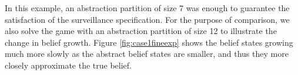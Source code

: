 In this example, an abstraction partition of size 7 was enough to guarantee the satisfaction of the surveillance specification.  For the purpose of comparison, we also solve the game with  an abstraction partition of size 12  to illustrate the change in belief growth. Figure \ref{fig:case1fineexp} shows the belief states growing much more slowly as the abstract belief states are smaller, and thus they more closely  approximate the true belief.
\begin{figure}

	\begin{minipage}{5.0cm}
		\centering
	\end{minipage}
	\begin{minipage}{5.0cm}
		\centering

\end{minipage}
\end{figure}
